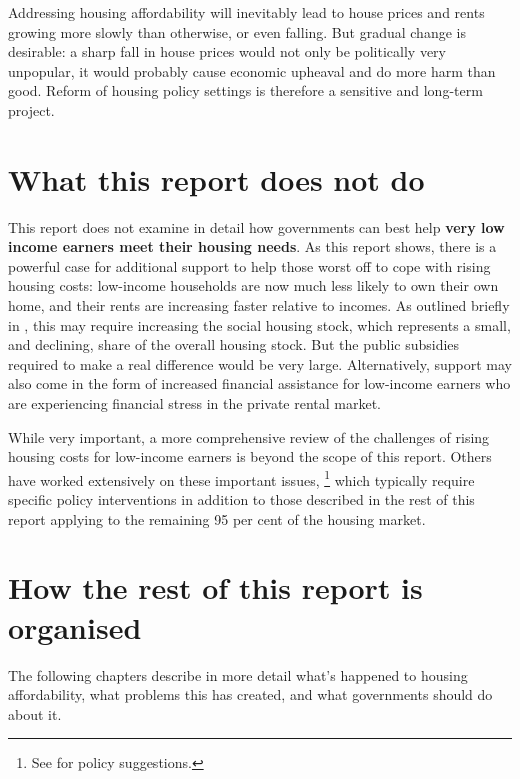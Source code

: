 Addressing housing affordability will inevitably lead to house prices and rents growing more slowly than otherwise, or even falling.
But gradual change is desirable: a sharp fall in house prices would not only be politically very unpopular, it would probably cause economic upheaval and do more harm than good.
Reform of housing policy settings is therefore a sensitive and long-term project.


\section{What this report does not do}\label{sec:what-this-report-does-not-do}

This report does not examine in detail how governments can best help \textbf{very low income earners meet their housing needs}.
As this report shows, there is a powerful case for additional support to help those worst off to cope with rising housing costs: low-income households are now much less likely to own their own home, and their rents are increasing faster relative to incomes.
As outlined briefly in , this may require increasing the social housing stock, which represents a small, and declining, share of the overall housing stock.
But the public subsidies required to make a real difference would be very large.
Alternatively, support may also come in the form of increased financial assistance for low-income earners who are experiencing financial stress in the private rental market.

While very important, a more comprehensive review of the challenges of rising housing costs for low-income earners is beyond the scope of this report.
Others have worked extensively on these important issues,%
	\footnote{See \textcites{Yates2016why}{Pawson-et-al-2015-Addressing}{Milligan-2016-profiling}{SenateEconomicsRefAffordableHousing2015}{Rowley-etal-2017-Govt-led-innovations-affordable-housing-delivery} for policy suggestions.}
which typically require specific policy interventions in addition to those described in the rest of this report applying to the remaining 95 per cent of the housing market.

\section{How the rest of this report is organised}\label{sec:how-the-rest-of-this-report-is-organised}

The following chapters describe in more detail what's happened to housing affordability, what problems this has created, and what governments should do about it.

